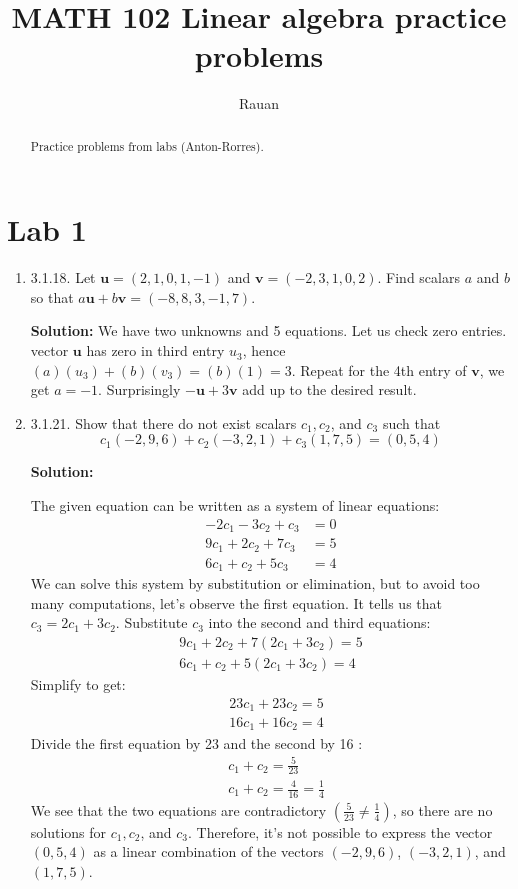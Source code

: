 \documentclass{article}
\title{MATH 102 Linear algebra practice problems}
\author{Rauan}
\begin{document}
\maketitle

\begin{abstract}
  Practice problems from labs (Anton-Rorres). 
\end{abstract}

\tableofcontents

\section{Lab 1} \label{sec:Lab-1}
\begin{enumerate}
\item 3.1.18. Let $\mathbf{u}=(2,1,0,1,-1)$ and $\mathbf{v}=(-2,3,1,0,2)$. Find scalars $a$ and $b$ so that $a \mathbf{u}+b \mathbf{v}=(-8,8,3,-1,7)$.

\textbf{Solution:} We have two unknowns and 5 equations. Let us check zero entries. vector $\mathbf{u}$ has zero in third entry $u_3$, hence $(a)(u_3)+(b)(v_3)=(b)(1)=3$. Repeat for the 4th entry of $\mathbf{v}$, we get $a=-1$. Surprisingly $-\mathbf{u}+3\mathbf{v}$ add up to the desired result.

\item 3.1.21. Show that there do not exist scalars $c_1, c_2$, and $c_3$ such that
$$
c_1(-2,9,6)+c_2(-3,2,1)+c_3(1,7,5)=(0,5,4)
$$

\textbf{Solution:}

The given equation can be written as a system of linear equations:
$$
\begin{aligned}
-2 c_1-3 c_2+c_3 & =0 \\
9 c_1+2 c_2+7 c_3 & =5 \\
6 c_1+c_2+5 c_3 & =4
\end{aligned}
$$
We can solve this system by substitution or elimination, but to avoid too many computations, let's observe the first equation. It tells us that $c_3=2 c_1+3 c_2$.
Substitute $c_3$ into the second and third equations:
$$
\begin{gathered}
9 c_1+2 c_2+7\left(2 c_1+3 c_2\right)=5 \\
6 c_1+c_2+5\left(2 c_1+3 c_2\right)=4
\end{gathered}
$$
Simplify to get:
$$
\begin{aligned}
& 23 c_1+23 c_2=5 \\
& 16 c_1+16 c_2=4
\end{aligned}
$$
Divide the first equation by 23 and the second by 16 :
$$
\begin{aligned}
& c_1+c_2=\frac{5}{23} \\
& c_1+c_2=\frac{4}{16}=\frac{1}{4}
\end{aligned}
$$
We see that the two equations are contradictory $\left(\frac{5}{23} \neq \frac{1}{4}\right)$, so there are no solutions for $c_1, c_2$, and $c_3$. Therefore, it's not possible to express the vector $(0,5,4)$ as a linear combination of the vectors $(-2,9,6)$, $(-3,2,1)$, and $(1,7,5)$.


\end{enumerate}
\end{document}
